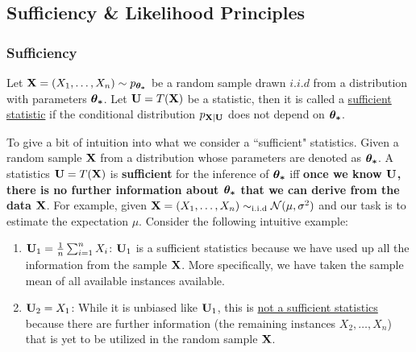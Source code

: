 \subsection{Sufficiency \& Likelihood Principles}
\newcommand{\FacT}{\hyperref[thm:factorisation_theorem]{(\mathrm{{\bf FacT}})}}

\subsubsection{Sufficiency}
\begin{definition}
    Let ${\bf X} = (X_1, \dots, X_n) \sim p_{\boldsymbol{\theta_*}}$ be a random sample drawn $i.i.d$ from a distribution with parameters $\boldsymbol{\theta_*}$. Let ${\bf U}=T({\bf X})$ be a statistic, then it is called a \underline{sufficient statistic} if the conditional distribution $p_{{\bf X}|{\bf U}}$ does not depend on $\boldsymbol{\theta_*}$.
\end{definition}

\begin{remark}
    To give a bit of intuition into what we consider a ``sufficient" statistics. Given a random sample ${\bf X}$ from a distribution whose parameters are denoted as $\boldsymbol{\theta_*}$. A statistics ${\bf U}=T({\bf X})$ is \textbf{sufficient} for the inference of $\boldsymbol{\theta_*}$ iff \textbf{once we know ${\bf U}$, there is no further information about $\boldsymbol{\theta_*}$ that we can derive from the data ${\bf X}$}. For example, given ${\bf X}=(X_1, \dots, X_n) \sim_\mathrm{i.i.d}\mathcal{N}(\mu, \sigma^2)$ and our task is to estimate the expectation $\mu$. Consider the following intuitive example:
    \begin{enumerate}[label=(\roman*)]
        \item ${\bf U}_1 = \frac{1}{n}\sum_{i=1}^n X_i$: ${\bf U}_1$ is a sufficient statistics because we have used up all the information from the sample ${\bf X}$. More specifically, we have taken the sample mean of all available instances available. 
        \item ${\bf U}_2 = X_1$: While it is unbiased like ${\bf U}_1$, this is \underline{not a sufficient statistics} because there are further information (the remaining instances $X_2, \dots, X_n$) that is yet to be utilized in the random sample ${\bf X}$.
    \end{enumerate} 
\end{remark} 


